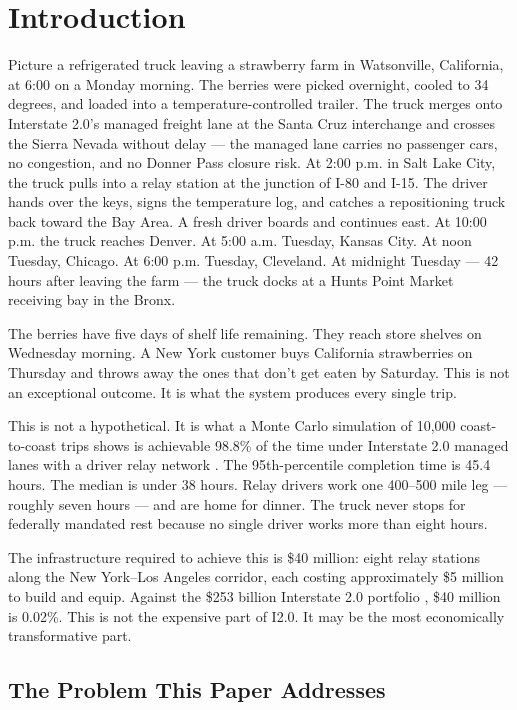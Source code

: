 \section{Introduction}
\label{sec:introduction}

Picture a refrigerated truck leaving a strawberry farm in Watsonville, California, at 6:00 on a Monday morning.
The berries were picked overnight, cooled to 34 degrees, and loaded into a temperature-controlled trailer.
The truck merges onto Interstate 2.0's managed freight lane at the Santa Cruz interchange and crosses
the Sierra Nevada without delay --- the managed lane carries no passenger cars, no congestion, and no
Donner Pass closure risk. At 2:00 p.m. in Salt Lake City, the truck pulls into a relay station at the
junction of I-80 and I-15. The driver hands over the keys, signs the temperature log, and catches
a repositioning truck back toward the Bay Area. A fresh driver boards and continues east.
At 10:00 p.m. the truck reaches Denver. At 5:00 a.m. Tuesday, Kansas City.
At noon Tuesday, Chicago. At 6:00 p.m. Tuesday, Cleveland.
At midnight Tuesday --- 42 hours after leaving the farm --- the truck docks at a
Hunts Point Market receiving bay in the Bronx.

The berries have five days of shelf life remaining. They reach store shelves on Wednesday morning.
A New York customer buys California strawberries on Thursday and throws away the ones that don't
get eaten by Saturday. This is not an exceptional outcome. It is what the system produces
every single trip.

This is not a hypothetical. It is what a Monte Carlo simulation of 10,000 coast-to-coast trips
shows is achievable 98.8\% of the time under Interstate 2.0 managed lanes with a driver relay
network \citep{ROUTE_C1}. The 95th-percentile completion time is 45.4 hours. The median is
under 38 hours. Relay drivers work one 400--500 mile leg --- roughly seven hours --- and are
home for dinner. The truck never stops for federally mandated rest because no single driver
works more than eight hours.

The infrastructure required to achieve this is \$40 million: eight relay stations along
the New York--Los Angeles corridor, each costing approximately \$5 million to build and equip.
Against the \$253 billion Interstate 2.0 portfolio \citep{ROUTE_E2}, \$40 million is 0.02\%.
This is not the expensive part of I2.0. It may be the most economically transformative part.

\subsection*{The Problem This Paper Addresses}

